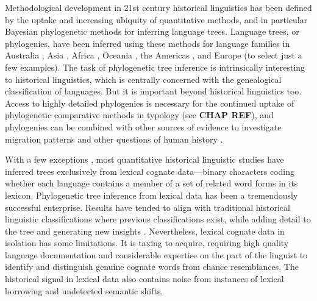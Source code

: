 \documentclass[]{article}
\begin{document}
Methodological development in 21st century historical linguistics has been defined by the uptake and increasing ubiquity of quantitative methods, and in particular Bayesian phylogenetic methods for inferring language trees. Language trees, or phylogenies, have been inferred using these methods for language families in Australia \autocite[Pama-Nyungan:][]{bowern_computational_2012}, Asia \autocites[Aslian:][]{dunn_aslian_2011}[Dravidian:][]{kolipakam_bayesian_2018}, Africa \autocite[Bantu:][]{whiteley_revising_2019}, Oceania \autocite[Austronesian:][]{gray_language_2009}, the Americas \autocites[Chapacuran:][]{birchall_combined_2016}[Tupí-Guaraní:][]{michael_bayesian_2015}, and Europe \autocites[Indo-European:][]{gray_language-tree_2003}{chang_ancestry-constrained_2015} (to select just a few examples). The task of phylogenetic tree inference is intrinsically interesting to historical linguistics, which is centrally concerned with the genealogical classification of languages. But it is important beyond historical linguistics too. Access to highly detailed phylogenies is necessary for the continued uptake of phylogenetic comparative methods in typology (see \textbf{CHAP REF}), and phylogenies can be combined with other sources of evidence to investigate migration patterns and other questions of human history \autocites[e.g.][]{hunley_genetic_2008}{bouckaert_mapping_2012}{malaspinas_genomic_2016}{bouckaert_origin_2018}.

With a few exceptions \autocites[e.g.][]{dunn_structural_2005}{dunn_structural_2008}, most quantitative historical linguistic studies have inferred trees exclusively from lexical cognate data---binary characters coding whether each language contains a member of a set of related word forms in its lexicon. Phylogenetic tree inference from lexical data has been a tremendously successful enterprise. Results have tended to align with traditional historical linguistic classifications where previous classifications exist, while adding detail to the tree and generating new insights \autocite[for example, the identification of major divisions within the Pama-Nyungan family, linking smaller, previously-identified subgroups, based on early phylogenetic splits inferred by][]{bowern_computational_2012}. Nevertheless, lexical cognate data in isolation has some limitations. It is taxing to acquire, requiring high quality language documentation and considerable expertise on the part of the linguist to identify and distinguish genuine cognate words from chance resemblances. The historical signal in lexical data also contains noise from instances of lexical borrowing and undetected semantic shifts.
\end{document}
